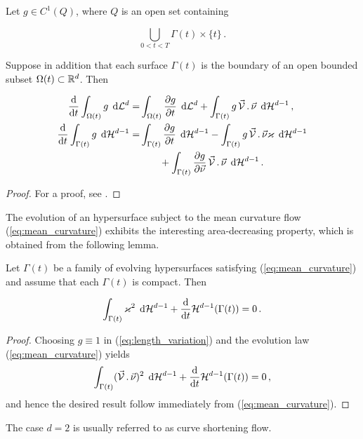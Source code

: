 \begin{lemma}
Let $g \in C^1(Q)$, where $Q$ is an open set containing

\begin{equation}
\bigcup_{0 < t < T} \Gamma(t) \times \{ t \} \, .
\end{equation}

Suppose in addition that each surface $\Gamma(t)$ is the boundary of an open
bounded subset $\Omega(t) \subset \mathbb R^d$. Then

\begin{align}
\frac{\rm d}{{\rm d}t} \int_{\Omega(t)} g \, \;{\rm d}{\cal L}^{d}  = &
\int_{\Omega(t)} \frac{\partial g}{\partial t} \, \;{\rm d}{\cal L}^{d}
+ \int_{\Gamma(t)} g \,\vec{\mathcal{V}}\,.\,\vec\nu \, \;{\rm d}{\cal H}^{d-1} \, ,
\label{eq:volume_variation} \\
\frac{\rm d}{{\rm d}t} \int_{\Gamma(t)} g \, \;{\rm d}{\cal H}^{d-1}  = &
\int_{\Gamma(t)} \frac{\partial g}{\partial t} \, \;{\rm d}{\cal H}^{d-1} -
\int_{\Gamma(t)} g \, \vec{\mathcal{V}}\,.\,\vec\nu \varkappa \, \;{\rm d}{\cal H}^{d-1}
\nonumber \\
& \qquad + \int_{\Gamma(t)} \frac{\partial g}{\partial \vec \nu}\,
\vec{\mathcal{V}}\,.\,\vec\nu \, \;{\rm d}{\cal H}^{d-1} \, .\label{eq:length_variation}
\end{align}
\end{lemma}

\begin{proof}
For a proof, see \cite[\S~2.6, Lemma 2.1]{DeckelnickDE05}.
\end{proof}

The evolution of an hypersurface subject to the mean curvature flow
(\ref{eq:mean_curvature}) exhibits the interesting area-decreasing property,
which is obtained from the following lemma.

\begin{lemma}
Let $\Gamma(t)$ be a family of evolving hypersurfaces satisfying
(\ref{eq:mean_curvature}) and assume that each $\Gamma(t)$ is
compact. Then

\begin{equation}
\int_{\Gamma(t)} \varkappa^2 \, \;{\rm d}{\cal H}^{d-1} +
\frac{\rm d}{{\rm d}t} \mathcal{H}^{d-1}(\Gamma(t)) = 0 \, . \label{eq:length_decrease}
\end{equation}

\end{lemma}

\begin{proof}
Choosing $g \equiv 1$ in (\ref{eq:length_variation}) and the evolution law
(\ref{eq:mean_curvature}) yields
\begin{equation*}
\int_{\Gamma(t)} (\vec{\mathcal{V}}\,.\,\vec\nu)^2 \,\;{\rm d}{\cal H}^{d-1} +\frac{\rm d}{{\rm d}t} \mathcal{H}^{d-1}(\Gamma(t)) = 0\,,
\end{equation*}
and hence the desired result follow immediately from (\ref{eq:mean_curvature}).
\end{proof}
The case $d = 2$ is usually referred to as curve shortening flow.

